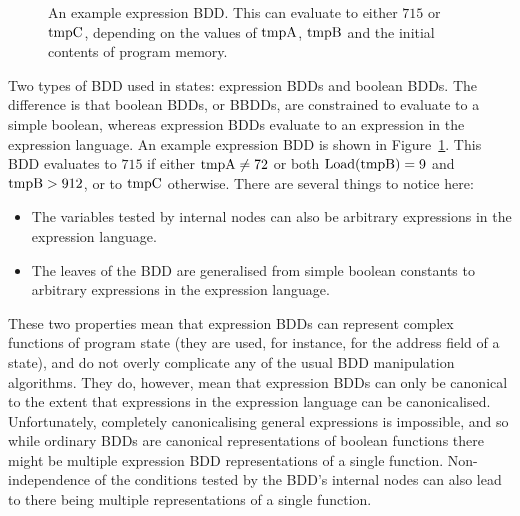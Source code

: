 \begin{figure}
  \begin{center}
  \end{center}
  \caption{An example expression BDD.  This can evaluate to either
    $715$ or $\mathrm{tmpC}$, depending on the values of $\mathrm{tmpA}$,
    $\mathrm{tmpB}$ and the initial contents of program memory.}
  \label{fig:derive:example_expr_bdd}
\end{figure}

Two types of BDD used in {\StateMachine} states: expression BDDs and
boolean BDDs.  The difference is that boolean BDDs, or BBDDs, are
constrained to evaluate to a simple boolean, whereas expression BDDs
evaluate to an expression in the expression language.  An example
expression BDD is shown in Figure~\ref{fig:derive:example_expr_bdd}.
This BDD evaluates to $715$ if either $\mathrm{tmpA} \not= 72$ or both
$\mathrm{Load}(\mathrm{tmpB}) = 9$ and $\mathrm{tmpB} > 912$, or to $\mathrm{tmpC}$
otherwise.  There are several things to notice here:

\begin{itemize}
\item The variables tested by internal nodes can also be arbitrary
  expressions in the expression language.
\item The leaves of the BDD are generalised from simple boolean
  constants to arbitrary expressions in the expression language.
\end{itemize}

These two properties mean that expression BDDs can represent complex
functions of program state (they are used, for instance, for the
address field of a  state), and do not overly complicate
any of the usual BDD manipulation algorithms.  They do, however, mean
that expression BDDs can only be canonical to the extent that
expressions in the expression language can be canonicalised.
Unfortunately, completely canonicalising general expressions is
impossible, and so while
ordinary BDDs are canonical representations of boolean functions there
might be multiple expression BDD representations of a single function.
Non-independence of the conditions tested by the BDD's internal nodes
can also lead to there being multiple representations of a single
function.

